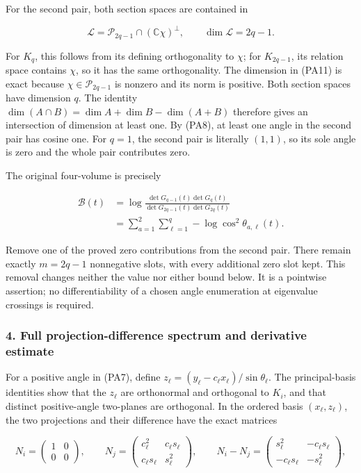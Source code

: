 For the second pair, both section spaces are contained in

\[
\mathcal L=\mathcal P_{2q-1}\cap(\mathbb C\chi)^\perp,
\qquad \dim\mathcal L=2q-1.
\tag{PA11}
\]

For \(K_q\), this follows from its defining orthogonality to \(\chi\); for \(K_{2q-1}\), its relation space contains \(\chi\), so it has the same orthogonality. The dimension in (PA11) is exact because \(\chi\in\mathcal P_{2q-1}\) is nonzero and its norm is positive. Both section spaces have dimension \(q\). The identity \(\dim(A\cap B)=\dim A+\dim B-\dim(A+B)\) therefore gives an intersection of dimension at least one. By (PA8), at least one angle in the second pair has cosine one. For \(q=1\), the second pair is literally \((1,1)\), so its sole angle is zero and the whole pair contributes zero.

The original four-volume is precisely

\[
\begin{aligned}
\mathcal B(t)
&=\log\frac{\det G_{q-1}(t)\det G_q(t)}
                {\det G_{2q-1}(t)\det G_{2q}(t)}\\
&=\sum_{a=1}^2\sum_{\ell=1}^q
          -\log\cos^2\theta_{a,\ell}(t).
\end{aligned}
\tag{PA12}
\]

Remove one of the proved zero contributions from the second pair. There remain exactly \(m=2q-1\) nonnegative slots, with every additional zero slot kept. This removal changes neither the value nor either bound below. It is a pointwise assertion; no differentiability of a chosen angle enumeration at eigenvalue crossings is required.

\subsubsection{4. Full projection-difference spectrum and derivative estimate}\label{endpoint-principal_angle_volume_review--full-projection-difference-spectrum-and-derivative-estimate}

For a positive angle in (PA7), define \(z_\ell=(y_\ell-c_\ell x_\ell)/\sin\theta_\ell\). The principal-basis identities show that the \(z_\ell\) are orthonormal and orthogonal to \(K_i\), and that distinct positive-angle two-planes are orthogonal. In the ordered basis \((x_\ell,z_\ell)\), the two projections and their difference have the exact matrices

\[
N_i=\begin{pmatrix}1&0\\0&0\end{pmatrix},\qquad
N_j=\begin{pmatrix}c_\ell^2&c_\ell s_\ell\\c_\ell s_\ell&s_\ell^2\end{pmatrix},
\qquad
N_i-N_j=
\begin{pmatrix}s_\ell^2&-c_\ell s_\ell\\-c_\ell s_\ell&-s_\ell^2\end{pmatrix},
\tag{PA13}
\]

